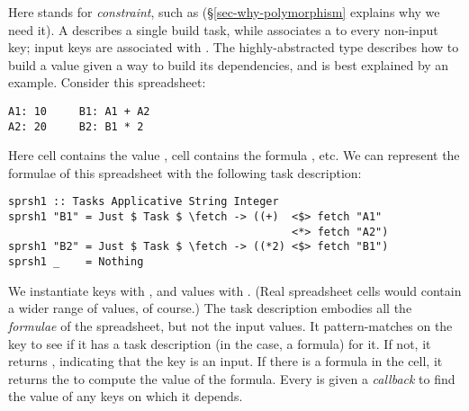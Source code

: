 \noindent
Here  stands for \emph{constraint}, such as 
(\S\ref{sec-why-polymorphism} explains why we need it).
A  describes a single build task, while  associates a
 to every non-input key; input keys are associated with .
The highly-abstracted type  describes how to build a value given
a way to build its dependencies, and is best explained by an example.
Consider this \Excel spreadsheet:

\begin{verbatim}
A1: 10     B1: A1 + A2
A2: 20     B2: B1 * 2
\end{verbatim}

\noindent
Here cell  contains the value , cell  contains the
formula , etc. We can represent the formulae of this spreadsheet
with the following task description:

\vspace{1mm}
\begin{verbatim}
sprsh1 :: Tasks Applicative String Integer
sprsh1 "B1" = Just $ Task $ \fetch -> ((+)  <$> fetch "A1"
                                            <*> fetch "A2")
sprsh1 "B2" = Just $ Task $ \fetch -> ((*2) <$> fetch "B1")
sprsh1 _    = Nothing
\end{verbatim}
\vspace{1mm}

\noindent
We instantiate keys  with , and values  with .
(Real spreadsheet cells would contain a wider range of values, of course.) The
task description  embodies all the \emph{formulae} of the spreadsheet,
but not the input values. It pattern-matches on the key to see if it has a task
description (in the \Excel case, a formula) for it. If not, it returns
, indicating that the key is an input. If there is a formula in the
cell, it returns the  to compute the value of the formula. Every
 is given a \emph{callback}  to find the value of any keys on
which it depends.


